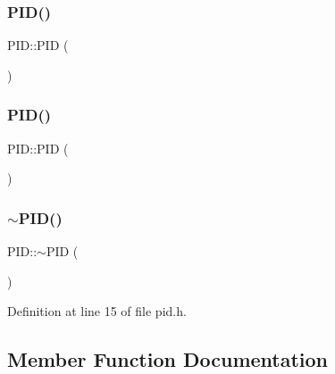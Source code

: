 \subsubsection{\texorpdfstring{PID()}{PID()}\hspace{0.1cm}{\footnotesize\ttfamily [3/4]}}
{\footnotesize\ttfamily P\+I\+D\+::\+P\+ID (\begin{DoxyParamCaption}\item[{\mbox{\hyperlink{class_p_i_d}{P\+ID}} \&\&}]{ }\end{DoxyParamCaption})\hspace{0.3cm}{\ttfamily [default]}}

\mbox{\label{class_p_i_d_ab974b1244b215183b3dddd136c5f8198}} 
\subsubsection{\texorpdfstring{PID()}{PID()}\hspace{0.1cm}{\footnotesize\ttfamily [4/4]}}
{\footnotesize\ttfamily P\+I\+D\+::\+P\+ID (\begin{DoxyParamCaption}\item[{const \mbox{\hyperlink{class_p_i_d}{P\+ID}} \&}]{ }\end{DoxyParamCaption})\hspace{0.3cm}{\ttfamily [default]}}

\mbox{\label{class_p_i_d_ab7d389fc5b88d881bc25f5dafd360441}} 
\subsubsection{\texorpdfstring{$\sim$PID()}{~PID()}}
{\footnotesize\ttfamily P\+I\+D\+::$\sim$\+P\+ID (\begin{DoxyParamCaption}{ }\end{DoxyParamCaption})\hspace{0.3cm}{\ttfamily [inline]}}



Definition at line 15 of file pid.\+h.



\subsection{Member Function Documentation}
\mbox{\label{class_p_i_d_a4d19abca579301069c3edb28fd5ff7f2}} 
